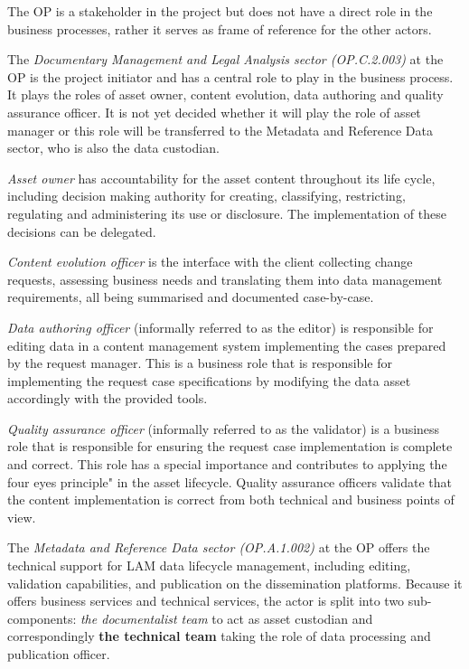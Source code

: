 	The OP is a stakeholder in the project but does not have a direct role in the business processes, rather it serves as frame of reference for the other actors. 
	
	The \textit{Documentary Management and Legal Analysis sector (OP.C.2.003)} at the OP is the project initiator and has a central role to play in the business process. It plays the roles of asset owner, content evolution, data authoring and quality assurance officer. It is not yet decided whether it will play the role of asset manager or this role will be transferred to the Metadata and Reference Data sector, who is also the data custodian.
		
	\textit{Asset owner} has accountability for the asset content throughout its life cycle, including decision making authority for creating, classifying, restricting, regulating and administering its use or disclosure. The implementation of these decisions can be delegated.
	
	\textit{Content evolution officer} is the interface with the client collecting change requests, assessing
business needs and translating them into data management requirements, all being
summarised and documented case-by-case.
	
	\textit{Data authoring officer} (informally referred to as the editor) is responsible for editing data in a content management system implementing the cases prepared by the request manager. This is a business role that is responsible for implementing the request case specifications by modifying the data asset accordingly with the provided tools.
	
	\textit{Quality assurance officer} (informally referred to as the validator) is a business role that is responsible for ensuring the request case implementation is complete and correct. This role has a special importance and contributes to applying the four eyes principle" in the asset lifecycle. Quality assurance officers validate that the content implementation is correct from both technical and business points of view.
	
	The \textit{Metadata and Reference Data sector (OP.A.1.002)} at the OP offers the technical support for LAM data lifecycle management, including editing, validation capabilities, and publication on the dissemination platforms. Because it offers business services and technical services, the actor is split into two sub-components: \textit{the documentalist team} to act as asset custodian and correspondingly \textbf{the technical team} taking the role of data processing and publication officer.
	

